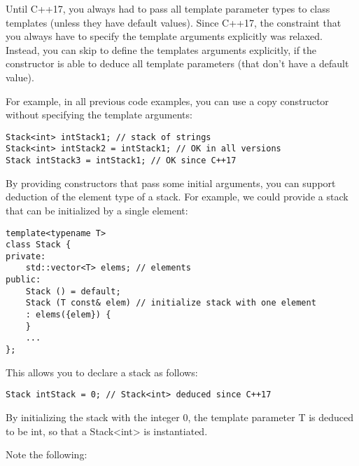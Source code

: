 Until C++17, you always had to pass all template parameter types to class templates (unless they have default values). Since C++17, the constraint that you always have to specify the template arguments explicitly was relaxed. Instead, you can skip to define the templates arguments explicitly, if the constructor is able to deduce all template parameters (that don’t have a default value).

For example, in all previous code examples, you can use a copy constructor without specifying the template arguments:

\begin{lstlisting}[style=styleCXX]
Stack<int> intStack1; // stack of strings
Stack<int> intStack2 = intStack1; // OK in all versions
Stack intStack3 = intStack1; // OK since C++17
\end{lstlisting}

By providing constructors that pass some initial arguments, you can support deduction of the element type of a stack. For example, we could provide a stack that can be initialized by a single element:

\begin{lstlisting}[style=styleCXX]
template<typename T>
class Stack {
private:
	std::vector<T> elems; // elements
public:
	Stack () = default;
	Stack (T const& elem) // initialize stack with one element
	: elems({elem}) {
	}
	...
};
\end{lstlisting}

This allows you to declare a stack as follows:

\begin{lstlisting}[style=styleCXX]
Stack intStack = 0; // Stack<int> deduced since C++17
\end{lstlisting}

By initializing the stack with the integer 0, the template parameter T is deduced to be int, so that a Stack<int> is instantiated.

Note the following:

